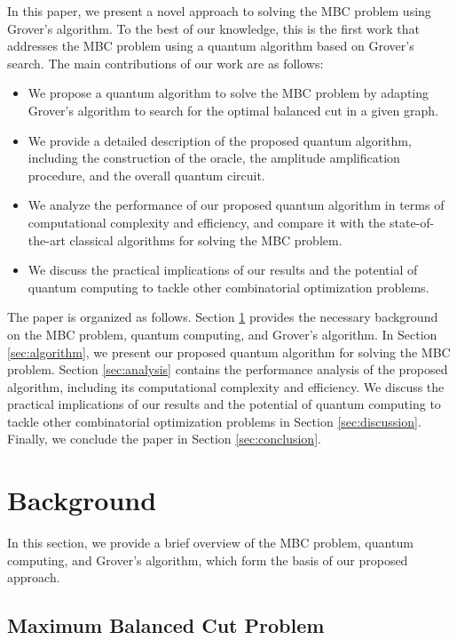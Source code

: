 In this paper, we present a novel approach to solving the MBC problem using Grover's algorithm. To the best of our knowledge, this is the first work that addresses the MBC problem using a quantum algorithm based on Grover's search. The main contributions of our work are as follows:

\begin{itemize}
    \item We propose a quantum algorithm to solve the MBC problem by adapting Grover's algorithm to search for the optimal balanced cut in a given graph.
    \item We provide a detailed description of the proposed quantum algorithm, including the construction of the oracle, the amplitude amplification procedure, and the overall quantum circuit.
    \item We analyze the performance of our proposed quantum algorithm in terms of computational complexity and efficiency, and compare it with the state-of-the-art classical algorithms for solving the MBC problem.
    \item We discuss the practical implications of our results and the potential of quantum computing to tackle other combinatorial optimization problems.
\end{itemize}

The paper is organized as follows. Section \ref{sec:background} provides the necessary background on the MBC problem, quantum computing, and Grover's algorithm. In Section \ref{sec:algorithm}, we present our proposed quantum algorithm for solving the MBC problem. Section \ref{sec:analysis} contains the performance analysis of the proposed algorithm, including its computational complexity and efficiency. We discuss the practical implications of our results and the potential of quantum computing to tackle other combinatorial optimization problems in Section \ref{sec:discussion}. Finally, we conclude the paper in Section \ref{sec:conclusion}.

\section{Background}
\label{sec:background}

In this section, we provide a brief overview of the MBC problem, quantum computing, and Grover's algorithm, which form the basis of our proposed approach.

\subsection{Maximum Balanced Cut Problem}

